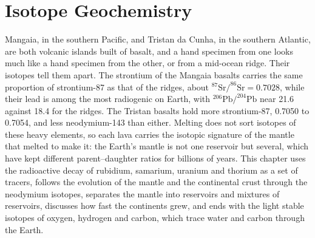 \chapter{Isotope Geochemistry}\label{ch:b2:isotope-geochemistry}

Mangaia, in the southern Pacific, and Tristan da Cunha, in the southern
Atlantic, are both volcanic islands built of basalt, and a hand specimen from
one looks much like a hand specimen from the other, or from a mid-ocean ridge.
Their isotopes tell them apart. The strontium of the Mangaia basalts carries
the same proportion of strontium-87 as that of the ridges, about
$^{87}\mathrm{Sr}/^{86}\mathrm{Sr} = 0.7028$, while their lead is among the most
radiogenic on Earth, with $^{206}\mathrm{Pb}/^{204}\mathrm{Pb}$ near 21.6 against
18.4 for the ridges. The Tristan basalts hold more strontium-87, 0.7050 to
0.7054, and less neodymium-143 than either. Melting does not sort isotopes of
these heavy elements, so each lava carries the isotopic signature of the
mantle that melted to make it: the Earth's mantle is not one reservoir but
several, which have kept different parent--daughter ratios for billions of
years. This chapter uses the radioactive decay of rubidium, samarium, uranium
and thorium as a set of tracers, follows the evolution of the mantle and the
continental crust through the neodymium isotopes, separates the mantle into
reservoirs and mixtures of reservoirs, discusses how fast the continents grew,
and ends with the light stable isotopes of oxygen, hydrogen and carbon, which
trace water and carbon through the Earth.

